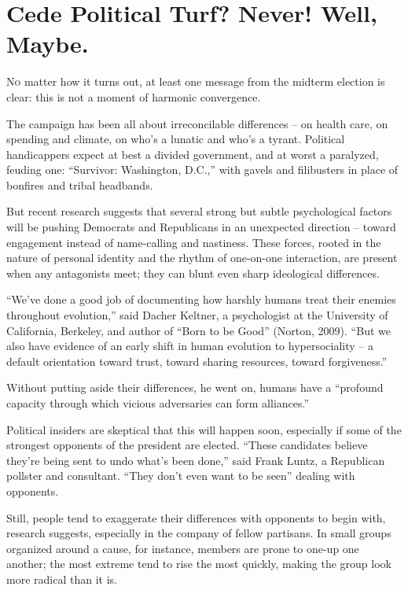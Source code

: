 ﻿\documentclass[12pt]{article}
\begin{document}
\section{Cede Political Turf? Never! Well, Maybe.}

\lettrine{N}{o} matter how it turns out, at least one message from the
midterm election is clear: this is not a moment of harmonic convergence.

The campaign has been all about irreconcilable differences -- on health care, on spending and
climate, on who's a lunatic and who's a tyrant. Political handicappers expect at best a divided
government, and at worst a paralyzed, feuding one: ``Survivor: Washington, D.C.,'' with gavels and
filibusters in place of bonfires and tribal headbands.

But recent research suggests that several strong but subtle psychological factors will be pushing
Democrats and Republicans in an unexpected direction -- toward engagement instead of name-calling
and nastiness. These forces, rooted in the nature of personal identity and the rhythm of one-on-one
interaction, are present when any antagonists meet; they can blunt even sharp ideological
differences.

``We've done a good job of documenting how harshly humans treat their enemies throughout
evolution,'' said Dacher Keltner, a psychologist at the University of California, Berkeley, and
author of ``Born to be Good'' (Norton, 2009). ``But we also have evidence of an early shift in human
evolution to hypersociality -- a default orientation toward trust, toward sharing resources, toward
forgiveness.''

Without putting aside their differences, he went on, humans have a ``profound capacity through which
vicious adversaries can form alliances.''

Political insiders are skeptical that this will happen soon, especially if some of the strongest
opponents of the president are elected. ``These candidates believe they're being sent to undo what's
been done,'' said Frank Luntz, a Republican pollster and consultant. ``They don't even want to be
seen'' dealing with opponents.

Still, people tend to exaggerate their differences with opponents to begin with, research suggests,
especially in the company of fellow partisans. In small groups organized around a cause, for
instance, members are prone to one-up one another; the most extreme tend to rise the most quickly,
making the group look more radical than it is.
\end{document}
